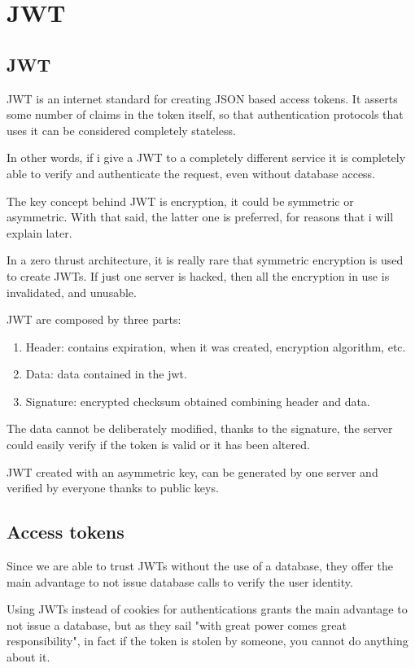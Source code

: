 \documentclass[20pt]{style}
\begin{document}
\section{JWT}
\subsection{JWT}
JWT is an internet standard for creating JSON based access tokens. It asserts
some number of claims in the token itself, so that authentication protocols that
uses it can be considered completely stateless.

In other words, if i give a JWT to a completely different service
it is completely able to verify and authenticate the request, even without
database access.

The key concept behind JWT is encryption, it could be symmetric or asymmetric.
With that said, the latter one is preferred, for reasons that i will explain
later.

In a zero thrust architecture, it is really rare that symmetric encryption is
used to create JWTs. If just one server is hacked, then all the encryption in
use is invalidated, and unusable.

JWT are composed by three  parts:

\begin{enumerate}
    \item Header: contains expiration, when it was created, encryption
        algorithm, etc.
    \item Data: data contained in the jwt.
    \item Signature: encrypted checksum obtained combining header and data.
\end{enumerate}

The data cannot be deliberately modified, thanks to the signature, the server
could easily verify if the token is valid or it has been altered.

JWT created with an asymmetric key, can be generated by one server and verified
by everyone thanks to public keys.

\subsection{Access tokens}
Since we are able to trust JWTs  without the use of a database, they offer the
main advantage to not issue database calls to verify the user identity.


Using JWTs instead of cookies for authentications grants the main advantage to
not issue a database, but as they sail "with great power comes great
responsibility", in fact if the token is stolen by someone, you cannot do
anything about it.
\end{document}
